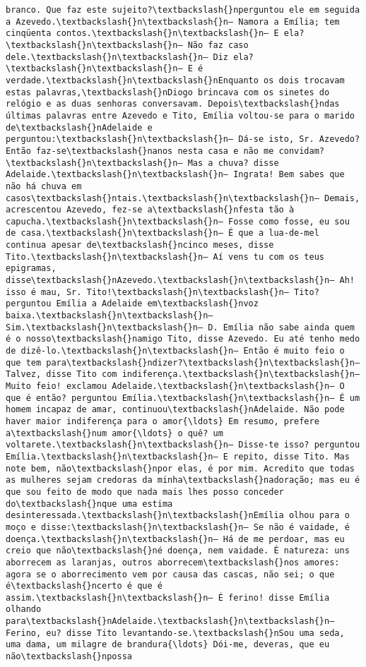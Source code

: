 \begin{Verbatim}[commandchars=\\\{\}]
branco. Que faz este sujeito?\textbackslash{}nperguntou ele em seguida a Azevedo.\textbackslash{}n\textbackslash{}n— Namora a Emília; tem cinqüenta contos.\textbackslash{}n\textbackslash{}n— E ela?\textbackslash{}n\textbackslash{}n— Não faz caso dele.\textbackslash{}n\textbackslash{}n— Diz ela?\textbackslash{}n\textbackslash{}n— E é verdade.\textbackslash{}n\textbackslash{}nEnquanto os dois trocavam estas palavras,\textbackslash{}nDiogo brincava com os sinetes do relógio e as duas senhoras conversavam. Depois\textbackslash{}ndas últimas palavras entre Azevedo e Tito, Emília voltou-se para o marido de\textbackslash{}nAdelaide e perguntou:\textbackslash{}n\textbackslash{}n— Dá-se isto, Sr. Azevedo? Então faz-se\textbackslash{}nanos nesta casa e não me convidam?\textbackslash{}n\textbackslash{}n— Mas a chuva? disse Adelaide.\textbackslash{}n\textbackslash{}n— Ingrata! Bem sabes que não há chuva em casos\textbackslash{}ntais.\textbackslash{}n\textbackslash{}n— Demais, acrescentou Azevedo, fez-se a\textbackslash{}nfesta tão à capucha.\textbackslash{}n\textbackslash{}n— Fosse como fosse, eu sou de casa.\textbackslash{}n\textbackslash{}n— É que a lua-de-mel continua apesar de\textbackslash{}ncinco meses, disse Tito.\textbackslash{}n\textbackslash{}n— Aí vens tu com os teus epigramas, disse\textbackslash{}nAzevedo.\textbackslash{}n\textbackslash{}n— Ah! isso é mau, Sr. Tito!\textbackslash{}n\textbackslash{}n— Tito? perguntou Emília a Adelaide em\textbackslash{}nvoz baixa.\textbackslash{}n\textbackslash{}n— Sim.\textbackslash{}n\textbackslash{}n— D. Emília não sabe ainda quem é o nosso\textbackslash{}namigo Tito, disse Azevedo. Eu até tenho medo de dizê-lo.\textbackslash{}n\textbackslash{}n— Então é muito feio o que tem para\textbackslash{}ndizer?\textbackslash{}n\textbackslash{}n— Talvez, disse Tito com indiferença.\textbackslash{}n\textbackslash{}n— Muito feio! exclamou Adelaide.\textbackslash{}n\textbackslash{}n— O que é então? perguntou Emília.\textbackslash{}n\textbackslash{}n— É um homem incapaz de amar, continuou\textbackslash{}nAdelaide. Não pode haver maior indiferença para o amor{\ldots} Em resumo, prefere a\textbackslash{}num amor{\ldots} o quê? um voltarete.\textbackslash{}n\textbackslash{}n— Disse-te isso? perguntou Emília.\textbackslash{}n\textbackslash{}n— E repito, disse Tito. Mas note bem, não\textbackslash{}npor elas, é por mim. Acredito que todas as mulheres sejam credoras da minha\textbackslash{}nadoração; mas eu é que sou feito de modo que nada mais lhes posso conceder do\textbackslash{}nque uma estima desinteressada.\textbackslash{}n\textbackslash{}nEmília olhou para o moço e disse:\textbackslash{}n\textbackslash{}n— Se não é vaidade, é doença.\textbackslash{}n\textbackslash{}n— Há de me perdoar, mas eu creio que não\textbackslash{}né doença, nem vaidade. É natureza: uns aborrecem as laranjas, outros aborrecem\textbackslash{}nos amores: agora se o aborrecimento vem por causa das cascas, não sei; o que é\textbackslash{}ncerto é que é assim.\textbackslash{}n\textbackslash{}n— É ferino! disse Emília olhando para\textbackslash{}nAdelaide.\textbackslash{}n\textbackslash{}n— Ferino, eu? disse Tito levantando-se.\textbackslash{}nSou uma seda, uma dama, um milagre de brandura{\ldots} Dói-me, deveras, que eu não\textbackslash{}npossa 
\end{Verbatim}
